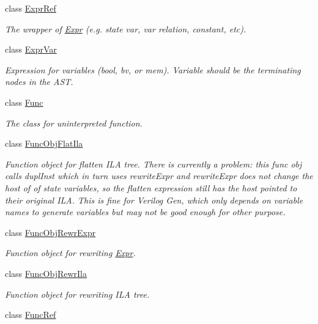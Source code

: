 \begin{DoxyCompactItemize}
class \mbox{\hyperlink{classilang_1_1_expr_ref}{Expr\+Ref}}
\begin{DoxyCompactList}\small\item\em The wrapper of \mbox{\hyperlink{classilang_1_1_expr}{Expr}} (e.\+g. state var, var relation, constant, etc). \end{DoxyCompactList}\item 
class \mbox{\hyperlink{classilang_1_1_expr_var}{Expr\+Var}}
\begin{DoxyCompactList}\small\item\em Expression for variables (bool, bv, or mem). Variable should be the terminating nodes in the A\+ST. \end{DoxyCompactList}\item 
class \mbox{\hyperlink{classilang_1_1_func}{Func}}
\begin{DoxyCompactList}\small\item\em The class for uninterpreted function. \end{DoxyCompactList}\item 
class \mbox{\hyperlink{classilang_1_1_func_obj_flat_ila}{Func\+Obj\+Flat\+Ila}}
\begin{DoxyCompactList}\small\item\em Function object for flatten I\+LA tree. There is currently a problem\+: this func obj calls dupl\+Inst which in turn uses rewrite\+Expr and rewrite\+Expr does not change the host of of state variables, so the flatten expression still has the host pointed to their original I\+LA. This is fine for Verilog Gen, which only depends on variable names to generate variables but may not be good enough for other purpose. \end{DoxyCompactList}\item 
class \mbox{\hyperlink{classilang_1_1_func_obj_rewr_expr}{Func\+Obj\+Rewr\+Expr}}
\begin{DoxyCompactList}\small\item\em Function object for rewriting \mbox{\hyperlink{classilang_1_1_expr}{Expr}}. \end{DoxyCompactList}\item 
class \mbox{\hyperlink{classilang_1_1_func_obj_rewr_ila}{Func\+Obj\+Rewr\+Ila}}
\begin{DoxyCompactList}\small\item\em Function object for rewriting I\+LA tree. \end{DoxyCompactList}\item 
class \mbox{\hyperlink{classilang_1_1_func_ref}{Func\+Ref}}

\end{DoxyCompactItemize}

